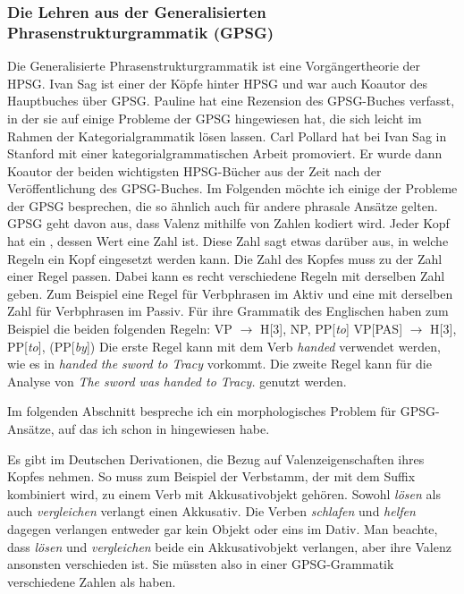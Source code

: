 \subsubsection{Die Lehren aus der Generalisierten Phrasenstrukturgrammatik (GPSG)}

Die Generalisierte Phrasenstrukturgrammatik \citep*{GKPS85a} ist eine Vorgängertheorie der
HPSG. Ivan Sag ist einer der Köpfe hinter HPSG \citep{ps,ps2} und war auch Koautor des Hauptbuches
über GPSG. Pauline \citet{Jacobson87b} hat eine Rezension des GPSG-Buches verfasst, in der sie auf
einige Probleme der GPSG hingewiesen hat, die sich leicht im Rahmen der Kategorialgrammatik lösen lassen.
Carl Pollard hat bei Ivan Sag in Stanford mit einer kategorialgrammatischen Arbeit
\citep{Pollard84a-u} promoviert. Er wurde dann Koautor der beiden wichtigsten HPSG-Bücher aus der Zeit
nach der Veröffentlichung des GPSG-Buches. Im Folgenden möchte ich einige der Probleme der GPSG
besprechen, die so ähnlich auch für andere phrasale Ansätze gelten. GPSG geht davon aus, dass Valenz
mithilfe von Zahlen kodiert wird. Jeder Kopf hat ein \subcatm, dessen Wert eine Zahl ist. Diese Zahl
sagt etwas darüber aus, in welche Regeln ein Kopf eingesetzt werden kann. Die Zahl des Kopfes muss
zu der Zahl einer Regel passen. Dabei kann es recht verschiedene Regeln mit derselben Zahl
geben. Zum Beispiel eine Regel für Verbphrasen im Aktiv und eine mit derselben Zahl für Verbphrasen
im Passiv. Für ihre Grammatik des Englischen haben \citet[57, 60]{GKPS85a} zum Beispiel die beiden folgenden
Regeln:
\eal
\ex VP $\to$ H[3], NP, PP[\emph{to}]
\ex VP[PAS] $\to$ H[3], PP[\emph{to}], (PP[\emph{by}])
\zl
Die erste Regel kann mit dem Verb \emph{handed} verwendet werden, wie es in \emph{handed the sword
  to Tracy} vorkommt. Die zweite Regel kann für die Analyse von \emph{The sword was handed to
  Tracy.} genutzt werden.

Im folgenden Abschnitt bespreche ich ein morphologisches Problem für GPSG-Ansätze, auf das ich schon in
 hingewiesen habe. 

\label{sec-bar-Derivation-GPSG}

Es gibt im Deutschen Derivationen, die Bezug auf Valenzeigenschaften ihres Kopfes nehmen. So muss
zum Beispiel der Verbstamm, der mit dem Suffix  kombiniert wird, zu einem Verb mit
Akkusativobjekt gehören. Sowohl \emph{lösen} als auch \emph{vergleichen} verlangt einen
Akkusativ. Die Verben \emph{schlafen} und \emph{helfen} dagegen verlangen entweder gar kein Objekt
oder eins im Dativ.
\eal
{}
\zl
Man beachte, dass \emph{lösen} und \emph{vergleichen} beide ein Akkusativobjekt verlangen, aber
ihre Valenz ansonsten verschieden ist. Sie müssten also in einer GPSG-Grammatik verschiedene Zahlen
als \subcatw haben.

